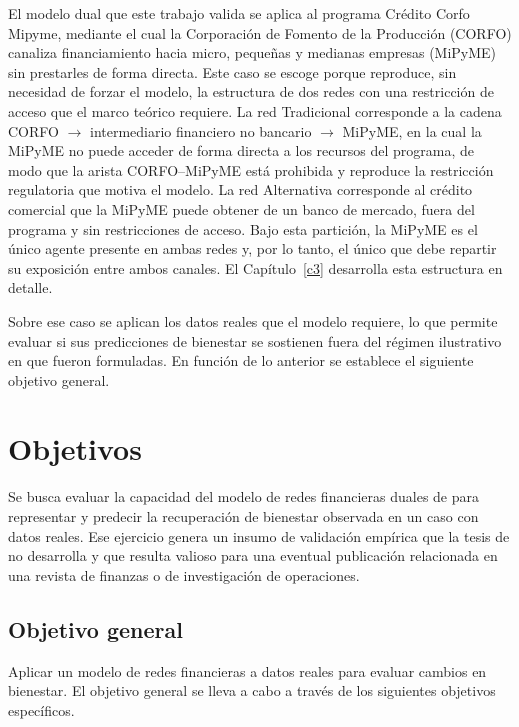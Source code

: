El modelo dual que este trabajo valida se aplica al programa Crédito Corfo Mipyme, mediante el cual la Corporación de Fomento de la Producción (CORFO) canaliza financiamiento hacia micro, pequeñas y medianas empresas (MiPyME) sin prestarles de forma directa. Este caso se escoge porque reproduce, sin necesidad de forzar el modelo, la estructura de dos redes con una restricción de acceso que el marco teórico requiere. La red Tradicional corresponde a la cadena CORFO $\to$ intermediario financiero no bancario $\to$ MiPyME, en la cual la MiPyME no puede acceder de forma directa a los recursos del programa, de modo que la arista CORFO--MiPyME está prohibida y reproduce la restricción regulatoria que motiva el modelo. La red Alternativa corresponde al crédito comercial que la MiPyME puede obtener de un banco de mercado, fuera del programa y sin restricciones de acceso. Bajo esta partición, la MiPyME es el único agente presente en ambas redes y, por lo tanto, el único que debe repartir su exposición entre ambos canales. El Capítulo~\ref{c3} desarrolla esta estructura en detalle.

Sobre ese caso se aplican los datos reales que el modelo requiere, lo que permite evaluar si sus predicciones de bienestar se sostienen fuera del régimen ilustrativo en que fueron formuladas. En función de lo anterior se establece el siguiente objetivo general.

\section{Objetivos}
\label{c1:objetivos}

Se busca evaluar la capacidad del modelo de redes financieras duales de  para representar y predecir la recuperación de bienestar observada en un caso con datos reales. Ese ejercicio genera un insumo de validación empírica que la tesis de  no desarrolla y que resulta valioso para una eventual publicación relacionada en una revista de finanzas o de investigación de operaciones.

\subsection{Objetivo general}

Aplicar un modelo de redes financieras a datos reales para evaluar cambios en bienestar. El objetivo general se lleva a cabo a través de los siguientes objetivos específicos.

